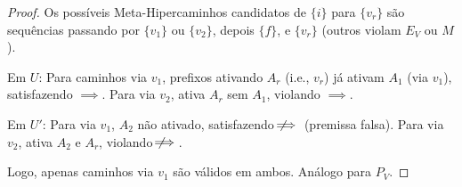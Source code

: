 \documentclass{article}
\begin{document}
\begin{proof}
Os possíveis Meta-Hipercaminhos candidatos de \( \{i\} \) para \( \{v_r\} \) são sequências passando por \( \{v_1\} \) ou \( \{v_2\} \), depois \( \{f\} \), e \( \{v_r\} \) (outros violam \( E_V \) ou \( M \)).

Em \( U \): Para caminhos via \( v_1 \), prefixos ativando \( A_r \) (i.e., \( v_r \)) já ativam \( A_1 \) (via \( v_1 \)), satisfazendo \( \implies \). Para via \( v_2 \), ativa \( A_r \) sem \( A_1 \), violando \( \implies \).

Em \( U' \): Para via \( v_1 \), \( A_2 \) não ativado, satisfazendo \( \not\!\!\!\implies \) (premissa falsa). Para via \( v_2 \), ativa \( A_2 \) e \( A_r \), violando \( \not\!\!\!\implies \).

Logo, apenas caminhos via \( v_1 \) são válidos em ambos. Análogo para \( P_V \).
\end{proof}

\newpage
\end{document}

